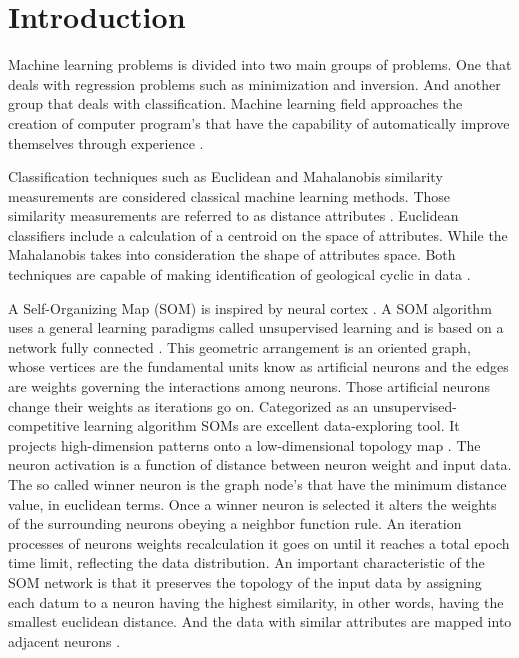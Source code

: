 \documentclass[preprint,12pt]{elsarticle}
\begin{document}
\linenumbers

\section{Introduction}
\label{sec:intro}

Machine learning problems is divided into two main groups of problems. One that deals with regression problems such as minimization and inversion. And another group that deals with classification.  Machine learning field approaches the creation of computer program's that have the capability of automatically improve themselves through experience \citep{Michie1994,MacKay2005}. 


Classification techniques such as Euclidean and Mahalanobis similarity measurements are considered classical machine learning methods.  Those similarity measurements are referred to as distance attributes \citep{Deza2016}. Euclidean classifiers include a calculation of a centroid on the space of attributes. While the Mahalanobis takes into consideration the shape of attributes space. Both techniques are capable of making identification of geological cyclic in data \citep{Bergen2019}.


A Self-Organizing Map (SOM) is inspired by neural cortex \citep{Kohonen1989}. A SOM algorithm uses a general learning paradigms called unsupervised learning and is based on a network fully connected \citep{Haykin2001}. This geometric arrangement is an oriented graph, whose vertices are the fundamental units know as artificial neurons and the edges are weights governing the interactions among neurons. Those artificial neurons change their weights as iterations go on. Categorized as an unsupervised-competitive learning algorithm SOMs are excellent data-exploring tool. It projects high-dimension patterns onto a low-dimensional topology map \citep{Chaudhary2014}. The neuron activation is a function of distance between neuron weight and input data. The so called winner neuron is the graph node's that have the minimum distance value, in euclidean terms. Once a winner neuron is selected it alters the weights of the surrounding neurons obeying a neighbor function rule. An iteration processes of neurons weights recalculation it goes on until it reaches a total epoch time limit, reflecting the data distribution. An important characteristic of the SOM network is that it preserves the topology of the input data by assigning each datum to a neuron having the highest similarity, in other words, having the smallest euclidean distance. And the data with similar attributes are mapped into adjacent neurons \citep{kohonen2013}. 
\end{document}
